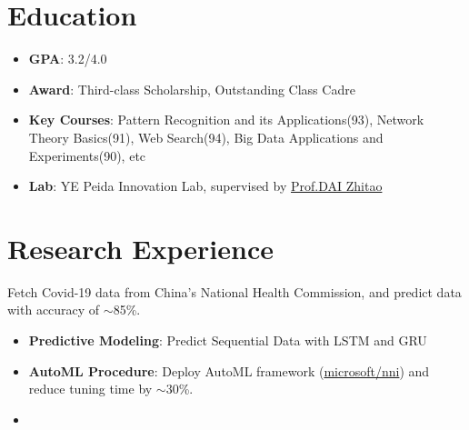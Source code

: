 \documentclass{resume}
\begin{document}




\section{\faGraduationCap \: Education}
\begin{itemize}
    \item \textbf{GPA}: 3.2/4.0
    \item \textbf{Award}: Third-class Scholarship, Outstanding Class Cadre
    \item \textbf{Key Courses}: Pattern Recognition and its Applications(93), Network Theory Basics(91), Web Search(94), Big Data Applications and Experiments(90), etc
\end{itemize}

\begin{itemize}
    \item \textbf{Lab}: YE Peida Innovation Lab, supervised by \href{https://teacher.bupt.edu.cn/dai/zh_CN/index.htm}{Prof.DAI Zhitao}
\end{itemize}


\section{\faSearch \: Research Experience}
Fetch Covid-19 data from China's National Health Commission, and predict data with accuracy of $\sim$85\%.
\begin{itemize}
    \item \textbf{Predictive Modeling}: Predict Sequential Data with LSTM and GRU
    \item \textbf{AutoML Procedure}: Deploy AutoML framework  (\href{https://github.com/microsoft/nni}{microsoft/nni}) and reduce tuning time by $\sim$30\%.
    \item {}
\end{itemize}
\end{document}
